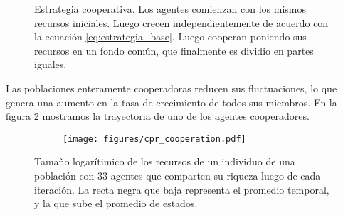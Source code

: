 \documentclass[a4paper,10pt]{article}
\begin{document}
\begin{figure}[H]
\centering
{}
\caption{Estrategia cooperativa. Los agentes comienzan con los mismos recursos iniciales. Luego crecen independientemente de acuerdo con la ecuaci\'on \ref{eq:estrategia_base}. Luego cooperan poniendo sus recursos en un fondo común, que finalmente es dividio en partes iguales.}
\label{fig:protocolo}
\end{figure}

Las poblaciones enteramente cooperadoras reducen sus fluctuaciones, lo que genera una aumento en la tasa de crecimiento de todos sus miembros.
En la figura \ref{fig:cpr_cooperation} mostramos la trayectoria de uno de los agentes cooperadores.
\begin{figure}[H]
    \centering
    \begin{subfigure}[b]{0.45\textwidth}
    \texttt{[image: figures/cpr\_cooperation.pdf]}
    \end{subfigure}
    \caption{
    Tamaño logarítimico de los recursos de un individuo de una población con 33 agentes que comparten su riqueza luego de cada iteración.
    La recta negra que baja representa el promedio temporal, y la que sube el promedio de estados.
    }
    \label{fig:cpr_cooperation}
\end{figure}
\end{document}
